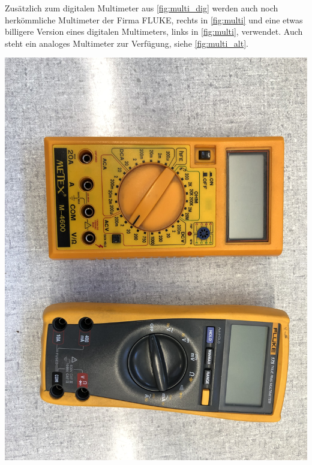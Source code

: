 \documentclass[11pt,ngerman]{scrartcl}
\begin{document}
Zusätzlich zum digitalen Multimeter aus \autoref{fig:multi_dig} werden auch noch herkömmliche Multimeter der Firma FLUKE, rechts in \autoref{fig:multi} und eine etwas billigere Version eines digitalen Multimeters, links in \autoref{fig:multi}, verwendet. Auch steht ein analoges Multimeter zur Verfügung, siehe \autoref{fig:multi_alt}.

\begin{minipage}{\textwidth}
	\begin{minipage}[t]{0.5\textwidth}
		\centering
		\includegraphics[width=\textwidth]{multi}
		\label{fig:multi}
	\end{minipage}
	\vspace{2mm}
	\begin{minipage}[t]{0.5\textwidth}
		\centering

\end{minipage}
\end{minipage}
\end{document}
